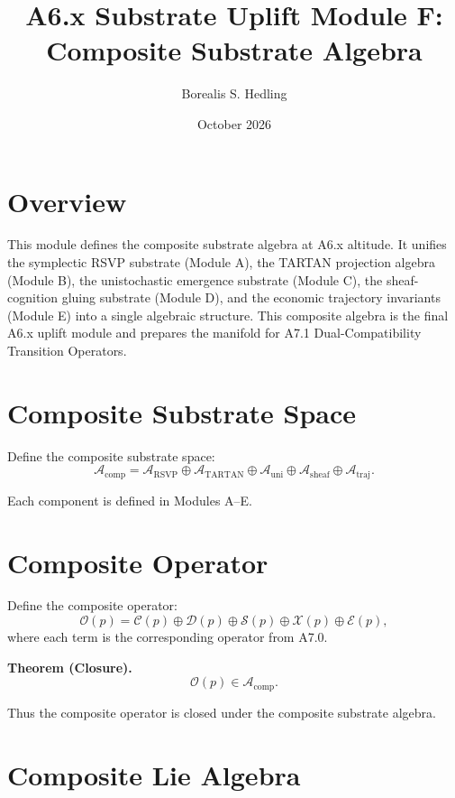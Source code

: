 \documentclass[11pt]{article}
\title{A6.x Substrate Uplift Module F: Composite Substrate Algebra}
\author{Borealis S. Hedling}
\date{October 2026}
\begin{document}
\maketitle

\section*{Overview}

This module defines the composite substrate algebra at A6.x altitude. It unifies
the symplectic RSVP substrate (Module A), the TARTAN projection algebra (Module
B), the unistochastic emergence substrate (Module C), the sheaf-cognition gluing
substrate (Module D), and the economic trajectory invariants (Module E) into a
single algebraic structure. This composite algebra is the final A6.x uplift
module and prepares the manifold for A7.1 Dual-Compatibility Transition
Operators.

\section{Composite Substrate Space}

Define the composite substrate space:
\[
\mathcal{A}_{\mathrm{comp}} =
\mathcal{A}_{\mathrm{RSVP}}
\oplus
\mathcal{A}_{\mathrm{TARTAN}}
\oplus
\mathcal{A}_{\mathrm{uni}}
\oplus
\mathcal{A}_{\mathrm{sheaf}}
\oplus
\mathcal{A}_{\mathrm{traj}}.
\]

Each component is defined in Modules A–E.

\section{Composite Operator}

Define the composite operator:
\[
\mathcal{O}(p) =
\mathcal{C}(p)
\oplus
\mathcal{D}(p)
\oplus
\mathcal{S}(p)
\oplus
\mathcal{X}(p)
\oplus
\mathcal{E}(p),
\]
where each term is the corresponding operator from A7.0.

\textbf{Theorem (Closure).}
\[
\mathcal{O}(p) \in \mathcal{A}_{\mathrm{comp}}.
\]

Thus the composite operator is closed under the composite substrate algebra.

\section{Composite Lie Algebra}
\end{document}
